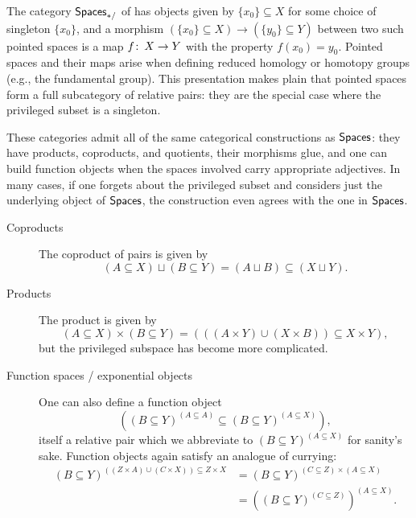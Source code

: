 \begin{definition}
The category $\mathsf{Spaces}_{*/}$ of  has objects given by $\{x_0\} \subseteq X$ for some choice of singleton $\{x_0\}$, and a morphism $(\{x_0\} \subseteq X) \to (\{y_0\} \subseteq Y)$ between two such pointed spaces is a map $f\colon\thinspace X \to Y$ with the property $f(x_0) = y_0$.
Pointed spaces and their maps arise when defining reduced homology or homotopy groups (e.g., the fundamental group).
This presentation makes plain that pointed spaces form a full subcategory of relative pairs: they are the special case where the privileged subset is a singleton.
\end{definition}

These categories admit all of the same categorical constructions as $\mathsf{Spaces}$: they have products, coproducts, and quotients, their morphisms glue, and one can build function objects when the spaces involved carry appropriate adjectives.
In many cases, if one forgets about the privileged subset and considers just the underlying object of $\mathsf{Spaces}$, the construction even agrees with the one in $\mathsf{Spaces}$.
\begin{description}
    \item[Coproducts]
    The coproduct of pairs is given by \[(A \subseteq X) \sqcup (B \subseteq Y) = (A \sqcup B) \subseteq (X \sqcup Y).\]
    \item[Products]
    The product is given by \[(A \subseteq X) \times (B \subseteq Y) = (((A \times Y) \cup (X \times B)) \subseteq X \times Y),\] but the privileged subspace has become more complicated.
    \item[Function spaces / exponential objects]
    One can also define a function object \[((B \subseteq Y)^{(A \subseteq A)} \subseteq (B \subseteq Y)^{(A \subseteq X)}),\] itself a relative pair which we abbreviate to $(B \subseteq Y)^{(A \subseteq X)}$ for sanity's sake.
    Function objects again satisfy an analogue of currying:%
    \begin{align*}
    (B \subseteq Y)^{((Z \times A) \cup (C \times X)) \subseteq Z \times X} & = (B \subseteq Y)^{(C \subseteq Z) \times (A \subseteq X)} \\
    & = \left( (B \subseteq Y)^{(C \subseteq Z)} \right)^{(A \subseteq X)}.
    \end{align*}
\end{description}

